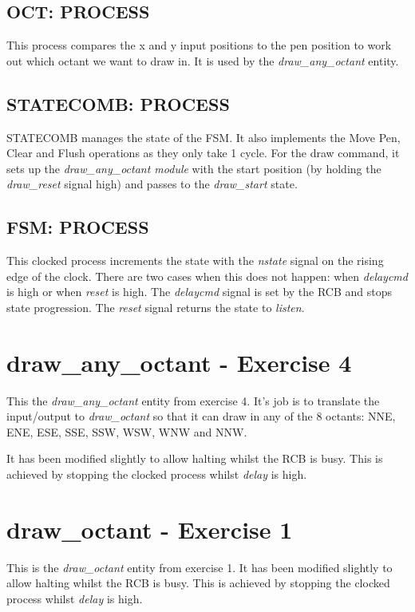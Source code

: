 \documentclass[11pt,a4paper]{article}
\begin{document}
\subsection{OCT: PROCESS}
This process compares the x and y input positions to the pen position to work
out which octant we want to draw in. It is used by the \emph{draw\_any\_octant}
entity.

\subsection{STATECOMB: PROCESS}
STATECOMB manages the state of the FSM. It also implements the Move Pen,
Clear and Flush operations as they only take 1 cycle. For the draw command, it sets up the \emph{draw\_any\_octant module} with the start position
(by holding the \emph{draw\_reset} signal high) and passes to the
\emph{draw\_start} state.

\subsection{FSM: PROCESS}
This clocked process increments the state with the \emph{nstate} signal
on the rising edge of the clock. There are two cases when this does not happen:
when \emph{delaycmd} is high or when \emph{reset} is high. 
The \emph{delaycmd} signal is set by the RCB and stops state progression.
The \emph{reset} signal returns the state to \emph{listen}. 

\section{draw\_any\_octant - Exercise 4}
This the \emph{draw\_any\_octant} entity from exercise 4. It's job is to
translate the input/output to \emph{draw\_octant} so that it can draw in
any of the 8 octants: NNE, ENE, ESE, SSE, SSW, WSW, WNW and NNW.

It has been modified slightly to allow halting whilst the RCB is busy.
This is achieved by stopping the clocked process whilst \emph{delay} is high.

\section{draw\_octant - Exercise 1}
This is the \emph{draw\_octant} entity from exercise 1.
It has been modified slightly to allow halting whilst the RCB is busy.
This is achieved by stopping the clocked process whilst \emph{delay} is high.
\end{document}
